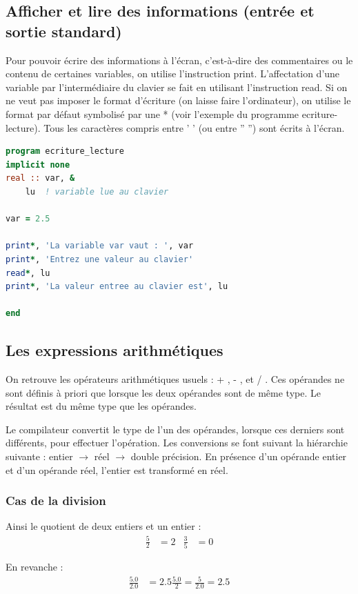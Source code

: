 \documentclass[a4paper,twoside]{article}
\begin{document}
\subsection{Afficher et lire des informations (entrée et sortie standard)}
Pour pouvoir écrire des informations à l'écran, c'est-à-dire des commentaires ou le contenu de certaines variables, on utilise l'instruction print. L'affectation d'une variable par l'intermédiaire du clavier se fait en utilisant l'instruction read. Si on ne veut pas imposer le format d'écriture (on laisse faire l'ordinateur), on utilise le format par défaut symbolisé par une * (voir l'exemple du programme ecriture-lecture). Tous les caractères compris entre ' ' (ou entre ” ”) sont écrits à l'écran.

\begin{lstlisting}[language=Fortran]
program ecriture_lecture
implicit none
real :: var, &
	lu	! variable lue au clavier

var = 2.5

print*, 'La variable var vaut : ', var
print*, 'Entrez une valeur au clavier'
read*, lu
print*, 'La valeur entree au clavier est', lu

end
\end{lstlisting}

\subsection{Les expressions arithmétiques}
On retrouve les opérateurs arithmétiques usuels : \og + \fg, \og - \fg, \og * \fg et \og / \fg. Ces opérandes ne sont définis à priori que lorsque les deux opérandes sont de même type. Le résultat est du même type que les opérandes. 

Le compilateur convertit le type de l'un des opérandes, lorsque ces derniers sont différents, pour effectuer l'opération. Les conversions se font suivant la hiérarchie suivante : entier $\rightarrow$ réel $\rightarrow$ double précision. En présence d'un opérande entier et d'un opérande réel, l'entier est transformé en réel. 

\subsubsection{Cas de la division}
Ainsi le quotient de deux entiers et un entier : 
\begin{align}
\frac{5}{2} &= 2 & \frac{3}{5} &= 0
\end{align}

En revanche :
\begin{align}
\frac{5.0}{2.0} &= 2.5 \frac{5.0}{2} = \frac{5}{2.0} = 2.5
\end{align}
\end{document}
